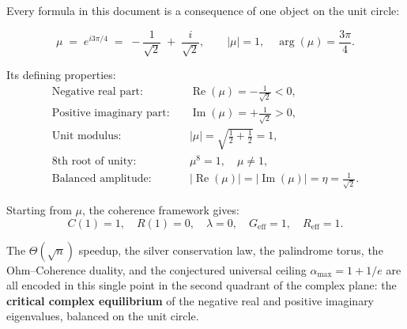 \documentclass[12pt,a4paper]{article}
\theoremstyle{plain}
\theoremstyle{definition}
\theoremstyle{remark}
\newcommand{\abs}[1]{\lvert #1 \rvert}
\begin{document}

\newpage
\begin{tcolorbox}[equilibrium,
  title={Closing — The Critical Complex Equilibrium}]

Every formula in this document is a consequence of one object on the unit circle:

\[
  \boxed{
    \mu \;=\; e^{i3\pi/4}
        \;=\; -\frac{1}{\sqrt{2}} \;+\; \frac{i}{\sqrt{2}},
    \qquad \abs{\mu}=1,\quad \arg(\mu)=\frac{3\pi}{4}.
  }
\]

\medskip
\noindent
Its defining properties:
\begin{align*}
  \text{Negative real part:}&\quad
    \operatorname{Re}(\mu) = -\tfrac{1}{\sqrt{2}} < 0,\\
  \text{Positive imaginary part:}&\quad
    \operatorname{Im}(\mu) = +\tfrac{1}{\sqrt{2}} > 0,\\
  \text{Unit modulus:}&\quad
    \abs{\mu} = \sqrt{\tfrac{1}{2}+\tfrac{1}{2}} = 1,\\
  \text{8th root of unity:}&\quad
    \mu^8 = 1,\quad \mu \ne 1,\\
  \text{Balanced amplitude:}&\quad
    \abs{\operatorname{Re}(\mu)} = \abs{\operatorname{Im}(\mu)} = \eta = \tfrac{1}{\sqrt{2}}.
\end{align*}

\medskip
\noindent
Starting from $\mu$, the coherence framework gives:
\[
  C(1) = 1,\quad
  R(1) = 0,\quad
  \lambda = 0,\quad
  G_{\mathrm{eff}} = 1,\quad
  R_{\mathrm{eff}} = 1.
\]

\medskip
\noindent
The $\Theta(\sqrt{n})$ speedup, the silver conservation law, the palindrome
torus, the Ohm--Coherence duality, and the conjectured universal ceiling
$\alpha_{\max}=1+1/e$ are all encoded in this single point in the second
quadrant of the complex plane: the \textbf{critical complex equilibrium} of
the negative real and positive imaginary eigenvalues, balanced on the unit circle.

\end{tcolorbox}
\end{document}
